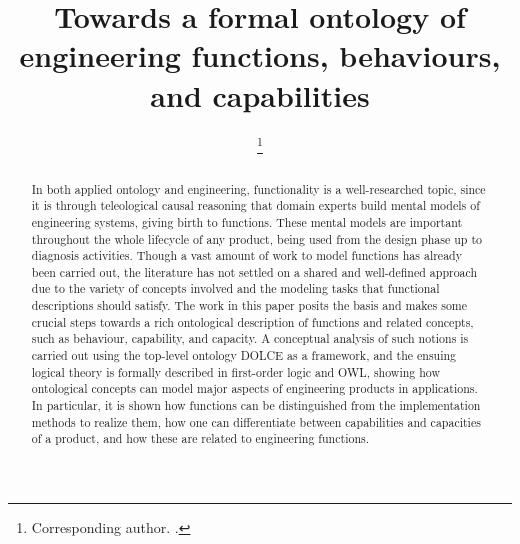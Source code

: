 \documentclass[sw]{iosart2x}
\begin{document}
\begin{frontmatter}

\title{Towards a formal ontology of engineering functions, behaviours, and capabilities
}


\begin{aug}
\author{ %
\thanks{Corresponding author. .}}
\author{ }
\address{Laboratory for Applied Ontology (LOA), ,
Trento, }
\end{aug}

\begin{abstract}
In both applied ontology and engineering, functionality is a well-researched topic, since it is through teleological causal reasoning that domain experts build mental models of engineering systems, giving birth to functions. 
These mental models are important throughout the whole lifecycle of any product, being used from the design phase up to   diagnosis activities. 
Though a vast amount of work to model functions has already been carried out, the literature has not settled on a shared and well-defined  approach due to the variety of concepts involved and the modeling tasks that functional descriptions should satisfy. 
The work in this paper posits the basis and  makes some crucial steps towards a rich ontological description of functions and related concepts, such as behaviour, capability, and capacity.
A conceptual analysis of such notions is carried out using the top-level ontology DOLCE as a framework, and 
the ensuing logical theory is formally described in first-order logic and OWL, showing how ontological concepts can model major aspects of engineering products in applications.
In particular, it is shown how functions can be distinguished from the implementation methods to realize them,  how  one can differentiate between capabilities and capacities of a product, and how these are related to engineering functions. 
\end{abstract}

\begin{keyword} 
\end{keyword}

\end{frontmatter}
\end{document}
